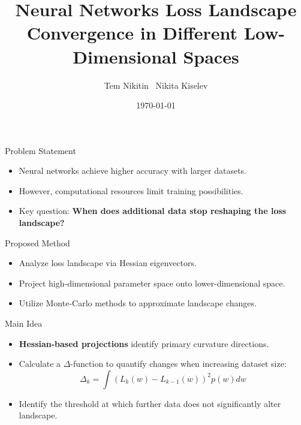 \documentclass{beamer}
\title[Loss Landscape Convergence]{Neural Networks Loss Landscape Convergence in Different Low-Dimensional Spaces}
\author{Tem Nikitin \ Nikita Kiselev}
\institute[MIPT]{Moscow Institute of Physics and Technology}
\date{\today}
\begin{document}
\begin{frame}
    \titlepage
\end{frame}

\begin{frame}{Problem Statement}
    \begin{itemize}
        \item Neural networks achieve higher accuracy with larger datasets.
        \item However, computational resources limit training possibilities.
        \item Key question: \textbf{When does additional data stop reshaping the loss landscape?}
    \end{itemize}
\end{frame}

\begin{frame}{Proposed Method}
    \begin{itemize}
        \item Analyze loss landscape via Hessian eigenvectors.
        \item Project high-dimensional parameter space onto lower-dimensional space.
        \item Utilize Monte-Carlo methods to approximate landscape changes.
    \end{itemize}
\end{frame}

\begin{frame}{Main Idea}
    \begin{itemize}
        \item \textbf{Hessian-based projections} identify primary curvature directions.
        \item Calculate a $\Delta$-function to quantify changes when increasing dataset size:
              $$\Delta_k = \int (L_k(w)-L_{k-1}(w))^2 p(w) dw$$
        \item Identify the threshold at which further data does not significantly alter landscape.
    \end{itemize}
\end{frame}
\end{document}
